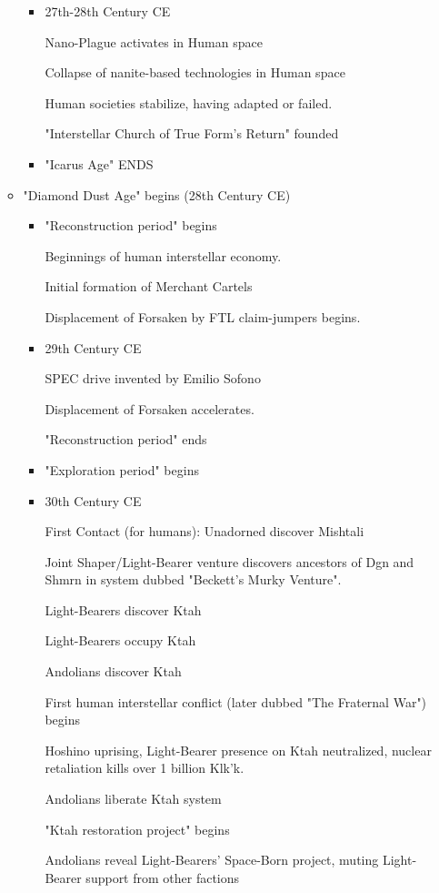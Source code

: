 \begin{itemize}
\begin{itemize}
\begin{itemize}
\item	27th-28th Century CE 

Nano-Plague activates in Human space 

Collapse of nanite-based technologies in Human space 

Human societies stabilize, having adapted or failed. 

"Interstellar Church of True Form's Return" founded 

\item "Icarus Age" ENDS 
\end{itemize}
\item "Diamond Dust Age" begins (28th Century CE) 
\begin{itemize}
\item	"Reconstruction period" begins 

Beginnings of human interstellar economy. 

Initial formation of Merchant Cartels 

Displacement of Forsaken by FTL claim-jumpers begins. 

\item	29th Century CE 

SPEC drive invented by Emilio Sofono 

Displacement of Forsaken accelerates. 

"Reconstruction period" ends 

\item	"Exploration period" begins 
\item	30th Century CE 

First Contact (for humans): Unadorned discover Mishtali 

Joint Shaper/Light-Bearer venture discovers ancestors of Dgn and Shmrn
in system dubbed "Beckett's Murky Venture".

Light-Bearers discover Ktah 

Light-Bearers occupy Ktah 

Andolians discover Ktah 

First human interstellar conflict (later dubbed "The Fraternal War")
begins

Hoshino uprising, Light-Bearer presence on Ktah neutralized, nuclear
retaliation kills over 1 billion Klk'k.

Andolians liberate Ktah system

"Ktah restoration project" begins 

Andolians reveal Light-Bearers' Space-Born project, muting
Light-Bearer support from other factions


\end{itemize}
\end{itemize}
\end{itemize}

